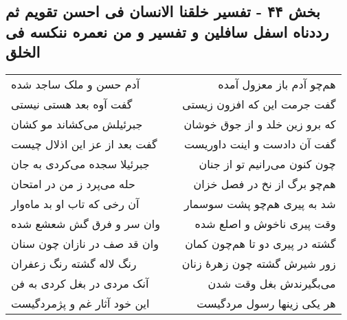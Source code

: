 \begin{center}
\section*{بخش ۴۴ - تفسیر خلقنا الانسان فی احسن تقویم ثم رددناه اسفل سافلین و  تفسیر و من نعمره ننکسه فی الخلق}
\label{sec:sh044}
\begin{longtable}{l p{0.5cm} r}
آدم حسن و ملک ساجد شده
&&
هم‌چو آدم باز معزول آمده
\\
گفت آوه بعد هستی نیستی
&&
گفت جرمت این که افزون زیستی
\\
جبرئیلش می‌کشاند مو کشان
&&
که برو زین خلد و از جوق خوشان
\\
گفت بعد از عز این اذلال چیست
&&
گفت آن دادست و اینت داوریست
\\
جبرئیلا سجده می‌کردی به جان
&&
چون کنون می‌رانیم تو از جنان
\\
حله می‌پرد ز من در امتحان
&&
هم‌چو برگ از نخ در فصل خزان
\\
آن رخی که تاب او بد ماه‌وار
&&
شد به پیری هم‌چو پشت سوسمار
\\
وان سر و فرق گش شعشع شده
&&
وقت پیری ناخوش و اصلع شده
\\
وان قد صف در نازان چون سنان
&&
گشته در پیری دو تا هم‌چون کمان
\\
رنگ لاله گشته رنگ زعفران
&&
زور شیرش گشته چون زهرهٔ زنان
\\
آنک مردی در بغل کردی به فن
&&
می‌بگیرندش بغل وقت شدن
\\
این خود آثار غم و پژمردگیست
&&
هر یکی زینها رسول مردگیست
\\
\end{longtable}
\end{center}
